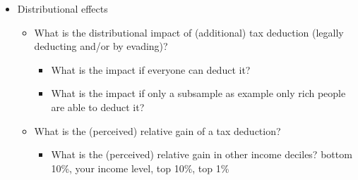 \documentclass[a4paper, 12pt]{article}
\begin{document}
\begin{itemize}
\begin{itemize}
\begin{itemize}
            \item How does this change with the income level of the household: bottom 10\%, your income level, top 10\%, top 1\%.
            \item How do (people (mis)perceive how) incentives to evade/to legally deduct depend on income? How do people (mis)perceive how these incentives depend on income?
        \end{itemize} 
        \end{itemize}
    \item Distributional effects
    \begin{itemize}
        \item What is the distributional impact of (additional) tax deduction (legally deducting and/or by evading)? 
        \begin{itemize}
            \item What is the impact if everyone can deduct it? 
            \item What is the impact if only a subsample as example only rich people are able to deduct it?
        \end{itemize}
        \item What is the (perceived) relative gain of a tax deduction?
        \begin{itemize}
            \item What is the (perceived) relative gain in other income deciles? bottom 10\%, your income level, top 10\%, top 1\% 
        \end{itemize}
    \end{itemize}

\end{itemize}
\end{document}

